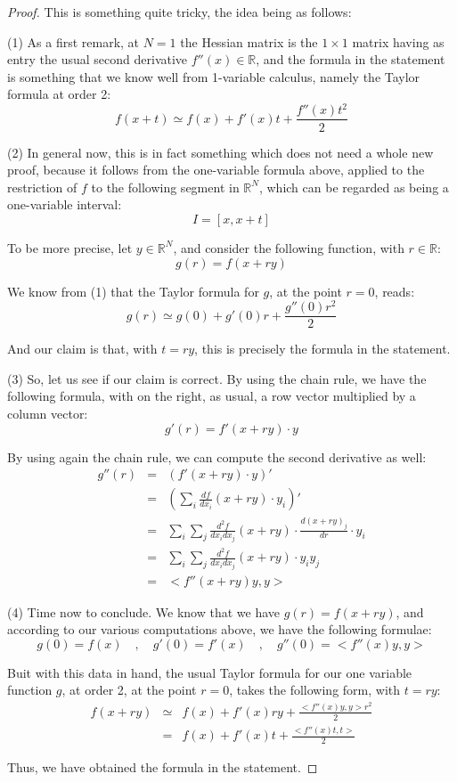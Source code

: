 \documentclass[12pt]{amsbook}
\begin{document}
\begin{proof}
This is something quite tricky, the idea being as follows:

\medskip

(1) As a first remark, at $N=1$ the Hessian matrix is the $1\times1$ matrix having as entry the usual second derivative $f''(x)\in\mathbb R$, and the formula in the statement is something that we know well from 1-variable calculus, namely the Taylor formula at order 2:
$$f(x+t)\simeq f(x)+f'(x)t+\frac{f''(x)t^2}{2}$$

(2) In general now, this is in fact something which does not need a whole new proof, because it follows from the one-variable formula above, applied to the restriction of $f$ to the following segment in $\mathbb R^N$, which can be regarded as being a one-variable interval:
$$I=[x,x+t]$$

To be more precise, let $y\in\mathbb R^N$, and consider the following function, with $r\in\mathbb R$:
$$g(r)=f(x+ry)$$

We know from (1) that the Taylor formula for $g$, at the point $r=0$, reads:
$$g(r)\simeq g(0)+g'(0)r+\frac{g''(0)r^2}{2}$$

And our claim is that, with $t=ry$, this is precisely the formula in the statement.

\medskip

(3) So, let us see if our claim is correct. By using the chain rule, we have the following formula, with on the right, as usual, a row vector multiplied by a column vector:
$$g'(r)=f'(x+ry)\cdot y$$

By using again the chain rule, we can compute the second derivative as well:
\begin{eqnarray*}
g''(r)
&=&(f'(x+ry)\cdot y)'\\
&=&\left(\sum_i\frac{df}{dx_i}(x+ry)\cdot y_i\right)'\\
&=&\sum_i\sum_j\frac{d^2f}{dx_idx_j}(x+ry)\cdot\frac{d(x+ry)_j}{dr}\cdot y_i\\
&=&\sum_i\sum_j\frac{d^2f}{dx_idx_j}(x+ry)\cdot y_iy_j\\
&=&<f''(x+ry)y,y>
\end{eqnarray*}

(4) Time now to conclude. We know that we have $g(r)=f(x+ry)$, and according to our various computations above, we have the following formulae:
$$g(0)=f(x)\quad,\quad 
g'(0)=f'(x)\quad,\quad 
g''(0)=<f''(x)y,y>$$

Buit with this data in hand, the usual Taylor formula for our one variable function $g$, at order 2, at the point $r=0$, takes the following form, with $t=ry$:
\begin{eqnarray*}
f(x+ry)
&\simeq&f(x)+f'(x)ry+\frac{<f''(x)y,y>r^2}{2}\\
&=&f(x)+f'(x)t+\frac{<f''(x)t,t>}{2}
\end{eqnarray*}

Thus, we have obtained the formula in the statement.
\end{proof}
\end{document}
